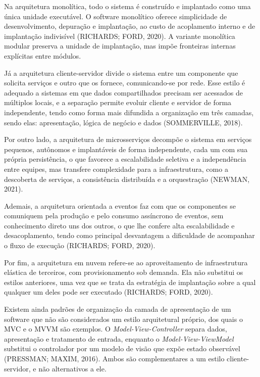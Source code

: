 \documentclass[12pt,oneside,a4paper,brazilian]{abntex2}
\begin{document}
Na arquitetura monolítica, todo o sistema é construído e implantado como uma única unidade executável. O software monolítico oferece simplicidade de desenvolvimento, depuração e implantação, ao custo de acoplamento interno e de implantação indivisível (RICHARDS; FORD, 2020). A variante monolítica modular preserva a unidade de implantação, mas impõe fronteiras internas explícitas entre módulos.

Já a arquitetura cliente-servidor divide o sistema entre um componente que solicita serviços e outro que os fornece, comunicando-se por rede. Esse estilo é adequado a sistemas em que dados compartilhados precisam ser acessados de múltiplos locais, e a separação permite evoluir cliente e servidor de forma independente, tendo como forma mais difundida a organização em três camadas, sendo elas: apresentação, lógica de negócio e dados (SOMMERVILLE, 2018).

Por outro lado, a arquitetura de microsserviços decompõe o sistema em serviços pequenos, autônomos e implantáveis de forma independente, cada um com sua própria persistência, o que favorece a escalabilidade seletiva e a independência entre equipes, mas transfere complexidade para a infraestrutura, como a descoberta de serviços, a consistência distribuída e a orquestração (NEWMAN, 2021).

Ademais, a arquitetura orientada a eventos faz com que os componentes se comuniquem pela produção e pelo consumo assíncrono de eventos, sem conhecimento direto uns dos outros, o que lhe confere alta escalabilidade e desacoplamento, tendo como principal desvantagem a dificuldade de acompanhar o fluxo de execução (RICHARDS; FORD, 2020).

Por fim, a arquitetura em nuvem refere-se ao aproveitamento de infraestrutura elástica de terceiros, com provisionamento sob demanda. Ela não substitui os estilos anteriores, uma vez que se trata da estratégia de implantação sobre a qual qualquer um deles pode ser executado (RICHARDS; FORD, 2020).

Existem ainda padrões de organização da camada de apresentação de um software que não são considerados um estilo arquitetural próprio, dos quais o MVC e o MVVM são exemplos. O \textit{Model-View-Controller} separa dados, apresentação e tratamento de entrada, enquanto o \textit{Model-View-ViewModel} substitui o controlador por um modelo de visão que expõe estado observável (PRESSMAN; MAXIM, 2016). Ambos são complementares a um estilo cliente-servidor, e não alternativos a ele.
\end{document}
